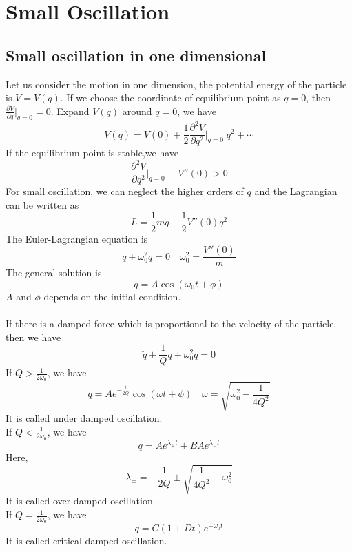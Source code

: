 \chapter{Small Oscillation}
\section{Small oscillation in one dimensional}
Let us consider the motion in one dimension, the potential energy of the particle is $V = V(q)$. If we choose the coordinate of equilibrium point as $q=0$, then $ \frac{\partial V}{\partial q} |_{q=0} = 0$. Expand $V(q)$ around $q=0$, we have
\[V(q) = V(0) + \frac{1}{2}  \frac{\partial^2 V}{\partial q^2} |_{q=0} \; q^2 + \cdots  \]
If the equilibrium point is stable,we have
\[\frac{\partial^2 V}{\partial q^2} |_{q=0} \equiv V''(0) > 0\]
For small oscillation, we can neglect the higher orders of $q$ and the Lagrangian can be written as
\[L = \frac{1}{2}m\dot{q} - \frac{1}{2}V''(0)q^2\]
The Euler-Lagrangian equation is
\[\ddot{q} + \omega_0^2 q = 0 \quad \omega_0^2 = \frac{V''(0)}{m}\]
The general solution is
\[q = A\cos(\omega_0 t + \phi)\]
$A$ and $\phi$ depends on the initial condition. \\ \\
If there is a damped force which is proportional to the velocity of the particle, then we have
\[\ddot{q} + \frac{1}{Q}\dot{q} + \omega_0^2 q = 0\]
If $Q > \frac{1}{2\omega_0}$, we have
\[q = A e^{-\frac{t}{2Q}} \cos(\omega t + \phi) \quad \omega = \sqrt{\omega_0^2 - \frac{1}{4Q^2}}\]
It is called under damped oscillation.\\
If $Q < \frac{1}{2\omega_0}$, we have
\[q = Ae^{\lambda_+ t} + B Ae^{\lambda_- t}\]
Here,
\[\lambda_{\pm} = -\frac{1}{2Q} \pm \sqrt{\frac{1}{4Q^2} - \omega_0^2 }\]
It is called over damped oscillation.\\
If $Q = \frac{1}{2\omega_0}$, we have
\[q = C(1+Dt)e^{-\omega_0 t}\]
It is called critical damped oscillation.

